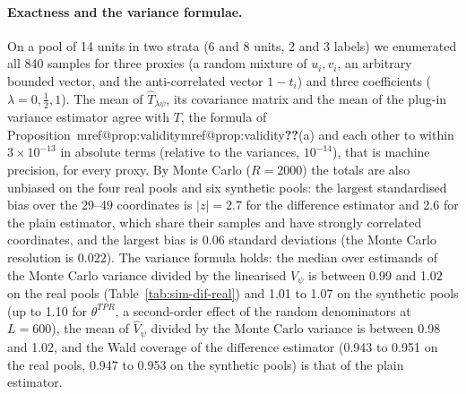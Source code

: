 \documentclass[pdflatex,sn-mathphys-num,iicol]{sn-jnl}
\makeatletter
\theoremstyle{thmstyleone}
\theoremstyle{thmstyletwo}
\theoremstyle{thmstylethree}
\newcommand{\Mref}[1]{\ifcsname mref@#1\endcsname\csname mref@#1\endcsname\else\textbf{??}\fi}
\makeatother
\begin{document}
\paragraph{Exactness and the variance formulae.} On a pool of 14 units in two strata (6 and 8 units, 2 and 3 labels) we enumerated all 840 samples for three proxies (a random mixture of $u_i,v_i$, an arbitrary bounded vector, and
the anti-correlated vector $1-t_i$) and three coefficients ($\lambda=0,\frac12,1$). The mean of $\hat T_{\lambda\psi}$, its covariance matrix and the mean of the plug-in variance estimator agree with $T$,
the formula of Proposition~\Mref{prop:validity}(a) and each other to within $3\times10^{-13}$ in absolute terms (relative to the variances, $10^{-14}$), that is machine precision, for every proxy. By Monte Carlo ($R=2000$) the totals are also unbiased on the four real pools and six synthetic pools: the largest standardised bias
over the 29--49 coordinates is $|z|=2.7$ for the difference estimator and 2.6 for the plain estimator, which share their samples and have strongly correlated coordinates, and the largest bias is 0.06 standard deviations
(the Monte Carlo resolution is 0.022). The variance formula holds: the median over estimands of the Monte Carlo variance divided by the linearised $V_\psi$ is between 0.99 and 1.02 on the real pools (Table~\ref{tab:sim-dif-real}) and 1.01 to 1.07 on the synthetic
pools (up to 1.10 for $\theta^{TPR}$, a second-order effect of the random denominators at $L=600$), the mean of $\hat V_\psi$ divided by the Monte Carlo variance is between 0.98 and 1.02, and the Wald coverage of the difference estimator
(0.943 to 0.951 on the real pools, 0.947 to 0.953 on the synthetic pools) is that of the plain estimator.
\end{document}
